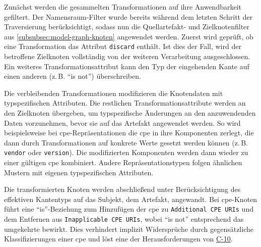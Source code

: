 Zunächst werden die gesammelten Transformationen auf ihre Anwendbarkeit gefiltert.
Der Namensraum-Filter wurde bereits während dem letzten Schritt der Traversierung berücksichtigt, sodass nun die Quellartefakt- und Zielknotenfilter aus \autoref{subsubsec:model-graph-knoten} angewendet werden.
Zuerst wird geprüft, ob eine Transformation das Attribut \texttt{discard} enthält.
Ist dies der Fall, wird der betroffene Zielknoten vollständig von der weiteren Verarbeitung ausgeschlossen.
Ein weiteres Transformationsattribut kann den Typ der eingehenden Kante auf einen anderen (z.\,B. \enquote{is not}) überschreiben.

Die verbleibenden Transformationen modifizieren die Knotendaten mit typspezifischen Attributen.
Die restlichen Transformationsattribute werden an den Zielknoten übergeben, um typspezifische Änderungen an den anzuwendenden Daten vorzunehmen, bevor sie auf das Artefakt angewendet werden.
So wird beispielsweise bei \acrshort{cpe}-Repräsentationen die \acrshort{cpe} in ihre Komponenten zerlegt, die dann durch Transformationen auf konkrete Werte gesetzt werden können (z.\,B. \texttt{vendor} oder \texttt{version}).
Die modifizierten Komponenten werden dann wieder zu einer gültigen \acrshort{cpe} kombiniert.
Andere Repräsentationstypen folgen ähnlichen Mustern mit eigenen typspezifischen Attributen.

Die transformierten Knoten werden abschließend unter Berücksichtigung des effektiven Kantentyps auf das Subjekt, dem Artefakt, angewandt.
Bei \acrshort{cpe}-Knoten führt eine \enquote{is}-Beziehung zum Hinzufügen der \acrshort{cpe} zu \texttt{Additional CPE URIs} und dem Entfernen aus \texttt{Inapplicable CPE URIs}, wobei \enquote{is not} entsprechend das umgekehrte bewirkt.
Dies verhindert implizit Widersprüche durch gegensätzliche Klassifizierungen einer \acrshort{cpe} und löst eine der Herausforderungen von \hyperref[subsec:c-10-order-dependency]{C-10}.
